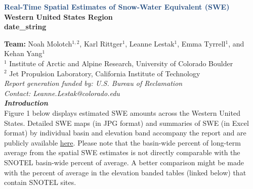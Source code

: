 \documentclass{article}
\begin{document}
\thispagestyle{firstpage}
\vspace*{3em}

\fontsize{14}{18}
\begin{center}
    \textbf{\textcolor[HTML]{1F497D}{
        Real-Time Spatial Estimates of Snow-Water Equivalent (SWE)\\
    }}
    \textbf{
        Western United States Region\\
        {{ date_string }}\\
        \vspace{1em}
    }
\end{center}

\fontsize{10}{14}
\noindent\textbf{Team:} Noah Molotch$^{1,2}$, Karl Rittger$^1$, Leanne Lestak$^1$, Emma Tyrrell$^1$, and Kehan Yang$^1$\\
$^1$ Institute of Arctic and Alpine Research, University of Colorado Boulder\\
$^2$ Jet Propulsion Laboratory, California Institute of Technology\\
\textit{Report generation funded by: U.S. Bureau of Reclamation}\\
\textit{Contact: Leanne.Lestak@colorado.edu}\\

\fontsize{12}{16}
\noindent\textbf{\textit{Introduction}}\\
\fontsize{10}{14}
Figure 1 below displays estimated SWE amounts across the Western United States. Detailed SWE maps (in JPG format) and summaries of SWE (in Excel format) by individual basin and elevation band accompany the report and are publicly available \href{https://github.com/CU-Mountain-Hydrology/WestWide}{here}. Please note that the basin-wide percent of long-term average from the spatial SWE estimates is not directly comparable with the SNOTEL basin-wide percent of average. A better comparison might be made with the percent of average in the elevation banded tables (linked below) that contain SNOTEL sites.\\
\section*{}\label{fig:1a}\vspace{-4em}
\end{document}
